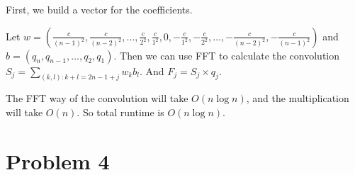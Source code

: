 \documentclass[letter,12pt]{article}
\begin{document}
First, we build a vector for the coefficients. 

Let $w=(\frac{c}{(n-1)^2}, 
\frac{c}{(n-2)^2}, \ldots, \frac{c}{2^2}, \frac{c}{1^2}, 0, -\frac{c}{1^2},
-\frac{c}{2^2}, \ldots, -\frac{c}{(n-2)^2}, -\frac{c}{(n-1)^2})$ and
$b=(q_n, q_{n-1}, \ldots, q_2, q_1)$. Then we can use FFT to calculate
the convolution $S_j=\sum\limits_{(k,l):k+l=2n-1+j} w_k b_l$. And 
$F_j=S_j \times q_j$.

The FFT way of the convolution will take $O(n\log n)$, and the 
multiplication will take $O(n)$. So total runtime is $O(n\log n)$.

\section*{Problem 4}
\end{document}
